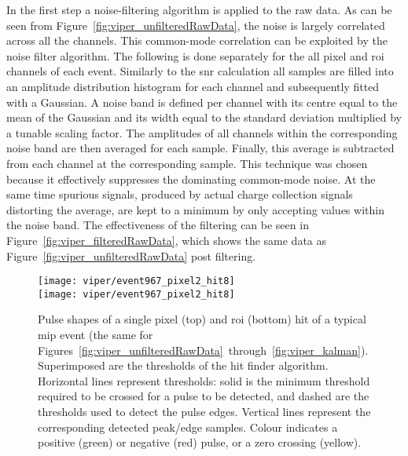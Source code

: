 In the first step a noise-filtering algorithm is applied to the raw data.
As can be seen from Figure~\ref{fig:viper_unfilteredRawData}, the noise is largely correlated across all the channels.
This common-mode correlation can be exploited by the noise filter algorithm.
The following is done separately for the all pixel and \gls{roi} channels of each event.
Similarly to the \gls{snr} calculation all samples are filled into an amplitude distribution histogram for each channel and subsequently fitted with a Gaussian.
A noise band is defined per channel with its centre equal to the mean of the Gaussian and its width equal to the standard deviation multiplied by a tunable scaling factor.
The amplitudes of all channels within the corresponding noise band are then averaged for each sample.
Finally, this average is subtracted from each channel at the corresponding sample.
This technique was chosen because it effectively suppresses the dominating common-mode noise.
At the same time spurious signals, produced by actual charge collection signals distorting the average, are kept to a minimum by only accepting values within the noise band.
The effectiveness of the filtering can be seen in Figure~\ref{fig:viper_filteredRawData}, which shows the same data as Figure~\ref{fig:viper_unfilteredRawData} post filtering.

\begin{figure}[tbp]
	\centering
	\texttt{[image: viper/event967\_pixel2\_hit8]}\\
	\texttt{[image: viper/event967\_pixel2\_hit8]}
	\caption[Pulse shapes of typical pixel demonstrator event]{%
		Pulse shapes of a single pixel (top) and \acrshort{roi} (bottom) hit of a typical \acrshort{mip} event (the same for Figures~\ref{fig:viper_unfilteredRawData}~through~\ref{fig:viper_kalman}).
		Superimposed are the thresholds of the hit finder algorithm. Horizontal lines represent thresholds: solid is the minimum threshold required to be crossed for a pulse to be detected, and dashed are the thresholds used to detect the pulse edges.
		Vertical lines represent the corresponding detected peak/edge samples.
		Colour indicates a positive (green) or negative (red) pulse, or a zero crossing (yellow).
	}
	\label{fig:viper_hitFinder}
\end{figure}

